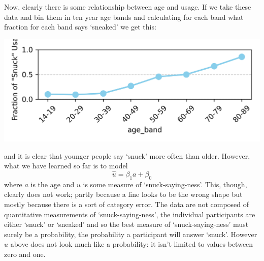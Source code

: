 \documentclass[12pt]{article}
\begin{document}
  Now, clearly there is some relationship between age and usage. If we
  take these data and bin them in ten year age bands and calculating
  for each band what fraction for each band says `sneaked' we get
  this:
\begin{center}
  \includegraphics[]{02.4_fraction.png}
  \end{center}
  and it is clear that younger people say `snuck' more often than
  older. However, what we have learned so far is to model
\begin{equation}
\hat{u}=\beta_1 a+\beta_0
\end{equation}
where $a$ is the age and $u$ is some measure of
`snuck-saying-ness'. This, though, clearly does not work; partly
because a line looks to be the wrong shape but mostly because there is
a sort of category error. The data are not composed of quantitative
measurements of `snuck-saying-ness', the individual participants are
either `snuck' or `sneaked' and so the best measure of
`snuck-saying-ness' must surely be a probability, the probability a
participant will answer `snuck'. However $\hat{u}$ above does not look
much like a probability: it isn't limited to values between zero and
one.
\end{document}
